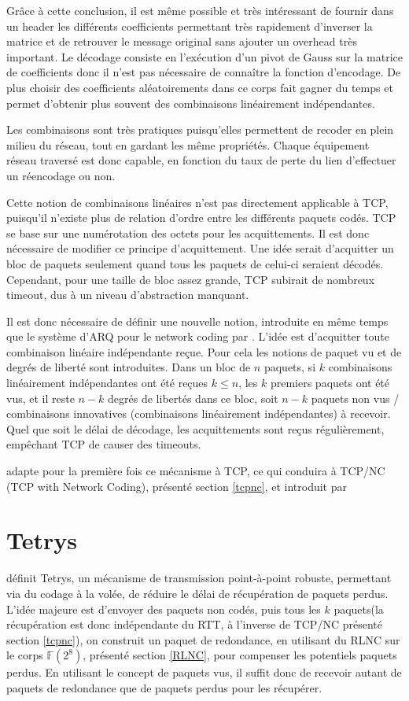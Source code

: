 \documentclass[frenchb]{article}
\begin{document}
 Grâce à cette conclusion, il est même possible et très intéressant de fournir dans un header les différents coefficients permettant très rapidement d'inverser la matrice et de retrouver le message original sans ajouter un overhead très important. Le décodage consiste en l'exécution d'un pivot de Gauss sur la matrice de coefficients donc il n'est pas nécessaire de connaître la fonction d'encodage. De plus choisir des coefficients aléatoirements dans ce corps fait gagner du temps et permet d'obtenir plus souvent des combinaisons linéairement indépendantes.

Les combinaisons sont très pratiques puisqu'elles permettent de recoder en plein milieu du réseau, tout en gardant les même propriétés. Chaque équipement réseau traversé est donc capable, en fonction du taux de perte du lien d'effectuer un réencodage ou non.

Cette notion de combinaisons linéaires n'est pas directement applicable à TCP, puisqu'il n'existe plus de relation d'ordre entre les différents paquets codés. TCP se base sur une numérotation des octets pour les acquittements. Il est donc nécessaire de modifier ce principe d'acquittement.
Une idée serait d'acquitter un bloc de paquets seulement quand tous les paquets de celui-ci seraient décodés. Cependant, pour une taille de bloc assez grande, TCP subirait de nombreux timeout, dus à un niveau d'abstraction manquant.

Il est donc nécessaire de définir une nouvelle notion, introduite en même temps que le système d'ARQ pour le network coding par \cite{arqfornc}. L'idée est d'acquitter toute combinaison linéaire indépendante reçue. Pour cela les notions de paquet vu et de degrés de liberté sont introduites. Dans un bloc de $n$ paquets, si $k$ combinaisons linéairement indépendantes ont été reçues $k \le n$, les $k$ premiers paquets ont été vus, et il reste $n-k$ degrés de libertés dans ce bloc, soit $n-k$ paquets non vus / combinaisons innovatives (combinaisons linéairement indépendantes) à recevoir. Quel que soit le délai de décodage, les acquittements sont reçus régulièrement, empêchant TCP de causer des timeouts.

\cite{ncmeetstcp} adapte pour la première fois ce mécanisme à TCP, ce qui conduira à TCP/NC (TCP with Network Coding), présenté section \ref{tcpnc}, et introduit par \cite{tcp/nc}


\section{Tetrys}
\cite{onthefly} définit Tetrys, un mécanisme de transmission point-à-point robuste, permettant via du codage à la volée, de réduire le délai de récupération de paquets perdus. L'idée majeure est d'envoyer des paquets non codés, puis tous les $k$ paquets(la récupération est donc indépendante du RTT, à l'inverse de TCP/NC présenté section \ref{tcpnc}), on construit un paquet de redondance, en utilisant du RLNC sur le corps $\mathbb{F}(2^8)$, présenté section \ref{RLNC}, pour compenser les potentiels paquets perdus. En utilisant le concept de paquets vus, il suffit donc de recevoir autant de paquets de redondance que de paquets perdus pour les récupérer.
\end{document}
